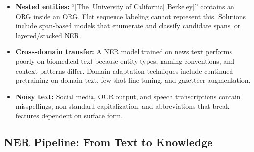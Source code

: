 \begin{itemize}
    \item \textbf{Nested entities:} ``[The [University of California] Berkeley]'' contains an
          ORG inside an ORG.  Flat sequence labeling cannot represent this.  Solutions include
          span-based models that enumerate and classify candidate spans, or layered/stacked
          NER.
    \item \textbf{Cross-domain transfer:} A NER model trained on news text performs poorly on
          biomedical text because entity types, naming conventions, and context patterns differ.
          Domain adaptation techniques include continued pretraining on domain text, few-shot
          fine-tuning, and gazetteer augmentation.
    \item \textbf{Noisy text:} Social media, OCR output, and speech transcriptions contain
          misspellings, non-standard capitalization, and abbreviations that break features
          dependent on surface form.
\end{itemize}

\subsection{NER Pipeline: From Text to Knowledge}

